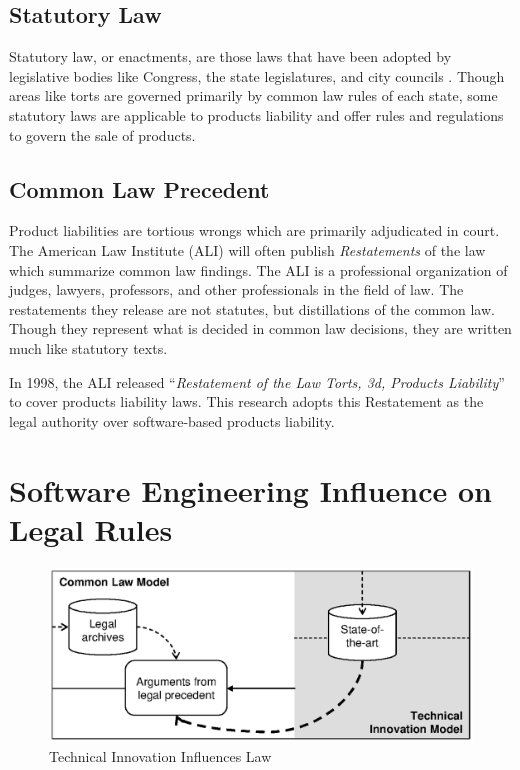 \subsection{Statutory Law}

Statutory law, or enactments, are those laws that have been adopted by
legislative bodies like Congress, the state legislatures, and city councils
\cite{McAdams07}. Though areas like torts are governed primarily by common law
rules of each state, some statutory laws are applicable to products liability
and offer rules and regulations to govern the sale of products.

\subsection{Common Law Precedent}

Product liabilities are tortious wrongs which are primarily adjudicated in
court. The American Law Institute (ALI) will often publish \textit{Restatements}
of the law which summarize common law findings. The ALI is a professional
organization of judges, lawyers, professors, and other professionals in the
field of law. The restatements they release are not statutes, but distillations
of the common law. Though they represent what is decided in common law
decisions, they are written much like statutory texts.

In 1998, the ALI released ``\textit{Restatement of the Law Torts, 3d, Products
Liability}'' \cite{Rest3d} to cover products liability laws. This research
adopts this Restatement as the legal authority over software-based products
liability.

\section{Software Engineering Influence on Legal Rules}

\begin{figure}[t]
\begin{center}
\includegraphics{figures/TechOnLaw.eps}
\end{center}
\caption{Technical Innovation Influences Law}
\label{fig:TechOnLaw}
\end{figure}


